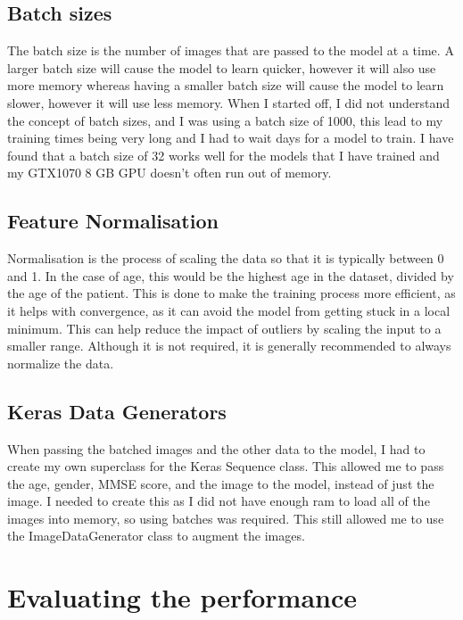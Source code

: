 \documentclass[]{final_report}
\begin{document}
\section{Batch sizes}
The batch size is the number of images that are passed to the model at a time.
A larger batch size will cause the model to learn quicker, however it will also use more memory whereas
having a smaller batch size will cause the model to learn slower, however it will use less memory.
When I started off, I did not understand the concept of batch sizes, and I was using a batch size of 1000, this lead to my training times
being very long and I had to wait days for a model to train.
I have found that a batch size of 32 works well for the models that I have trained and my GTX1070 8 GB GPU\cite{GTX1070} doesn't often run out of memory.

\section{Feature Normalisation}

Normalisation is the process of scaling the data so that it is typically between 0 and 1.
In the case of age, this would be the highest age in the dataset, divided by the age of the patient.
This is done to make the training process more efficient, as it helps with convergence, as it can avoid the model from getting stuck in a local minimum. This can help reduce the impact of outliers by scaling the input to a smaller range.
Although it is not required, it is generally recommended to always normalize the data.

\section{Keras Data Generators}

When passing the batched images and the other data to the model, I had to create my own superclass for the Keras Sequence class. This allowed me to pass the age, gender, MMSE score, and the image to the model, instead of just the image. I needed to create this as I did not have enough ram to load all of the images into memory, so using batches was required. This still allowed me to use the ImageDataGenerator class to augment the images.

\chapter{Evaluating the performance}
\end{document}
